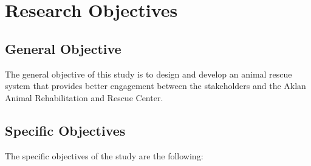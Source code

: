 \section{Research Objectives}
\label{sec:researchobjectives}

\subsection{General Objective}
\label{sec:generalobjective}

The general objective of this study is to design and develop an animal rescue system that provides better engagement between the stakeholders and the Aklan Animal Rehabilitation and Rescue Center.



\subsection{Specific Objectives}
\label{sec:specificobjectives}

%
%

The specific objectives of the study are the following:


